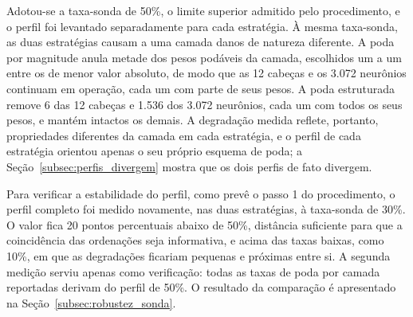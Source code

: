 Adotou-se a taxa-sonda de 50\%, o limite superior admitido pelo procedimento,
e o perfil foi levantado separadamente para cada
estratégia. À mesma taxa-sonda, as duas estratégias causam a uma camada danos de natureza
diferente. A poda por magnitude anula metade dos pesos podáveis da camada, escolhidos um a
um entre os de menor valor absoluto, de modo que as 12 cabeças e os 3.072 neurônios
continuam em operação, cada um com parte de seus pesos. A poda estruturada remove 6 das 12
cabeças e 1.536 dos 3.072 neurônios, cada um com todos os seus pesos, e mantém intactos os
demais. A degradação medida reflete, portanto, propriedades diferentes da camada em cada
estratégia, e o perfil de cada estratégia orientou apenas o seu próprio esquema de poda; a
Seção~\ref{subsec:perfis_divergem} mostra que os dois perfis de fato divergem.

Para verificar a estabilidade do perfil, como prevê o passo 1 do procedimento, o perfil
completo foi medido novamente, nas duas estratégias, à taxa-sonda de 30\%. O valor fica 20
pontos percentuais abaixo de 50\%, distância suficiente para que a coincidência das
ordenações seja informativa, e acima das taxas baixas, como 10\%, em que as degradações
ficariam pequenas e próximas entre si. A segunda medição serviu apenas como verificação:
todas as taxas de poda por camada reportadas derivam do perfil de 50\%. O resultado da
comparação é apresentado na Seção~\ref{subsec:robustez_sonda}.

